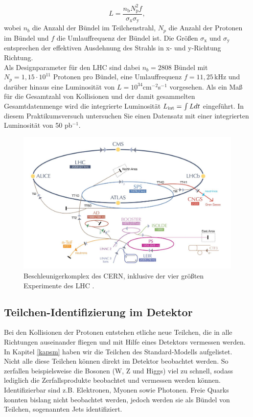 \begin{equation}
L=\frac{n_{\text{b}}N_{\text{p}}^{2}f}{\sigma_{\text{x}}\sigma_{\text{y}}},
\end{equation}
wobei $n_{b}$ die Anzahl der B\"undel im Teilchenstrahl, $N_{p}$ die Anzahl der Protonen im B\"undel und $f$ die Umlauffrequenz der B\"undel ist. Die Gr\"o\ss{}en $\sigma_{\text{x}}$ und $\sigma_{\text{y}}$ entsprechen der effektiven Ausdehnung des Strahls in x- und y-Richtung Richtung.\\
Als Designparameter f\"ur den LHC sind dabei $n_{b}=2808$ B\"undel mit $N_{p}=1,15\cdot 10^{11}$ Protonen pro B\"undel, eine Umlauffrequenz $f=11,25$\,kHz und dar\"uber hinaus eine Luminosit\"at von $L=10^{34}$cm$^{-2}$s$^{-1}$ vorgesehen. Als ein Ma\ss{} f\"ur die Gesamtzahl von Kollisionen und der damit gesammelten Gesamtdatenmenge wird die integrierte Luminosit\"at $L_{\rm{int}}=\int L dt$ eingef\"uhrt. In diesem Praktikumsversuch untersuchen Sie einen Datensatz mit einer integrierten Luminosit\"at von 50 pb$^{-1}$.
\begin{figure}[t]
	\centering
	\includegraphics[scale=0.35]{LHC/CERNkomplex}
	\caption[Beschleunigerkomplex des CERN]{Beschleunigerkomplex des CERN, inklusive der vier gr\"o\ss{}ten Experimente des LHC \cite{cernkomplex}.}
	\label{cernkomplex}
\end{figure}
\subsection{Teilchen-Identifizierung im Detektor}
Bei den Kollisionen der Protonen entstehen etliche neue Teilchen, die in alle Richtungen auseinander fliegen und mit Hilfe eines Detektors vermessen werden.
In Kapitel \ref{kapsm} haben wir die Teilchen des Standard-Modells aufgelistet. Nicht alle diese Teilchen k\"onnen direkt im Detektor beobachtet werden.
So zerfallen beispielsweise die Bosonen (W, Z und Higgs) viel zu schnell, sodass lediglich die Zerfallsprodukte beobachtet und vermessen werden k\"onnen.
Identifizierbar sind z.B. Elektronen, Myonen sowie Photonen. Freie Quarks konnten bislang nicht beobachtet werden, jedoch werden sie als B\"undel von Teilchen, sogenannten Jets identifiziert.

